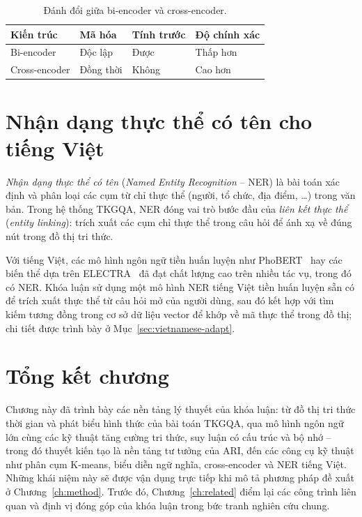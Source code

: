 \begin{table}[ht]
\centering
\caption{Đánh đổi giữa bi-encoder và cross-encoder.}
\label{tab:bicross}
\begin{tabular}{L{3.5cm} C{2.8cm} C{2.8cm} C{2.8cm}}
\toprule
\textbf{Kiến trúc} & \textbf{Mã hóa} & \textbf{Tính trước} & \textbf{Độ chính xác} \\
\midrule
Bi-encoder & Độc lập & Được & Thấp hơn \\
Cross-encoder & Đồng thời & Không & Cao hơn \\
\bottomrule
\end{tabular}
\end{table}

\section{Nhận dạng thực thể có tên cho tiếng Việt}
\label{sec:ner-bg}

\textit{Nhận dạng thực thể có tên} (\textit{Named Entity Recognition} -- NER) là bài toán xác định
và phân loại các cụm từ chỉ thực thể (người, tổ chức, địa điểm, \dots) trong văn bản. Trong hệ
thống TKGQA, NER đóng vai trò bước đầu của \textit{liên kết thực thể} (\textit{entity linking}):
trích xuất các cụm chỉ thực thể trong câu hỏi để ánh xạ về đúng nút trong đồ thị tri thức.

Với tiếng Việt, các mô hình ngôn ngữ tiền huấn luyện như PhoBERT~\cite{nguyen2020phobert} hay các
biến thể dựa trên ELECTRA~\cite{clark2020electra} đã đạt chất lượng cao trên nhiều tác vụ, trong đó
có NER. Khóa luận sử dụng một mô hình NER tiếng Việt tiền huấn luyện sẵn có để trích xuất thực thể
từ câu hỏi mở của người dùng, sau đó kết hợp với tìm kiếm tương đồng trong cơ sở dữ liệu vector để
khớp về mã thực thể trong đồ thị; chi tiết được trình bày ở Mục~\ref{sec:vietnamese-adapt}.

\section{Tổng kết chương}

Chương này đã trình bày các nền tảng lý thuyết của khóa luận: từ đồ thị tri thức thời gian và phát
biểu hình thức của bài toán TKGQA, qua mô hình ngôn ngữ lớn cùng các kỹ thuật tăng cường tri thức,
suy luận có cấu trúc và bộ nhớ -- trong đó thuyết kiến tạo là nền tảng tư tưởng của ARI, đến các
công cụ kỹ thuật như phân cụm K-means, biểu diễn ngữ nghĩa, cross-encoder và NER tiếng Việt. Những
khái niệm này sẽ được vận dụng trực tiếp khi mô tả phương pháp đề xuất ở Chương~\ref{ch:method}.
Trước đó, Chương~\ref{ch:related} điểm lại các công trình liên quan và định vị đóng góp của khóa
luận trong bức tranh nghiên cứu chung.

